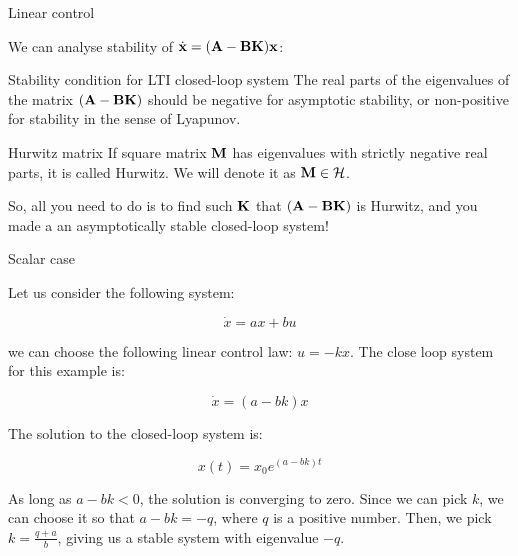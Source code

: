 \documentclass{beamer}
\begin{document}
\begin{frame}{Linear control}
\begin{flushleft}

We can analyse stability of $\dot{\mathbf{x}} = (\mathbf{A} - \mathbf{B}\mathbf{K})\mathbf{x}$:

\begin{block}{Stability condition for LTI closed-loop system}
The real parts of the eigenvalues of the matrix $(\mathbf{A} - \mathbf{B}\mathbf{K})$ should be negative for asymptotic stability, or non-positive for stability in the sense of Lyapunov.
\end{block}

\begin{block}{Hurwitz matrix}
	If square matrix $\mathbf{M}$ has eigenvalues with strictly negative real parts, it is called Hurwitz. We will denote it as $\mathbf{M} \in \mathcal{H}$.
\end{block}


So, all you need to do is to find such $\mathbf{K}$ that $(\mathbf{A} - \mathbf{B}\mathbf{K})$ is Hurwitz, and you made a an asymptotically stable closed-loop system!

\end{flushleft}
\end{frame}




\begin{frame}{Scalar case}
	\begin{flushleft}
		
		Let us consider the following system:
		
		\begin{equation}
			\dot x = a x + b u
		\end{equation}
	
		we can choose the following linear control law: $u = - k x$. The close loop system for this example is:
		
		\begin{equation}
			\dot x = (a- bk) x
		\end{equation}		
	
		The solution to the closed-loop system is:
		
		\begin{equation}
			x(t) =  x_0 e^{(a- bk)t}
		\end{equation}		
		
		As long as $a- bk < 0$, the solution is converging to zero. Since we can pick $k$, we can choose it so that $a- bk = -q$, where $q$ is a positive number. Then, we pick $k = \frac{q+a}{b}$, giving us a stable system with eigenvalue $-q$.
		
	\end{flushleft}
\end{frame}
\end{document}
